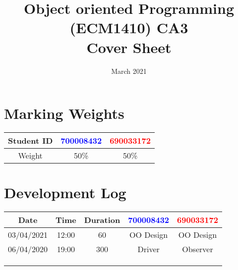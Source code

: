 \documentclass{article}
\title{%
  Object oriented Programming (ECM1410) CA3 \\
  \large Cover Sheet}
\date{March 2021}
\begin{document}
\maketitle

\section{Marking Weights}
\begin{center}
\begin{tabular}{ |c|c|c| } 
 \hline
 Student ID & \textcolor{blue}{700008432} & \textcolor{red}{690033172} \\
 \hline
 Weight & 50\% & 50\% \\
 \hline
\end{tabular}
\end{center}

\section{Development Log}
\begin{tabular}{ |c|c|c|c|c| } 
 \hline
 Date & Time & Duration & \textcolor{blue}{700008432} & \textcolor{red}{690033172} \\
 \hline
 03/04/2021&12:00&60&OO Design&OO Design \\
 \hline
 06/04/2020&19:00&300&Driver&Observer \\
 \hline
 &&&& \\
 \hline
 &&&& \\
 \hline
 &&&& \\
\end{tabular}
\end{document}

